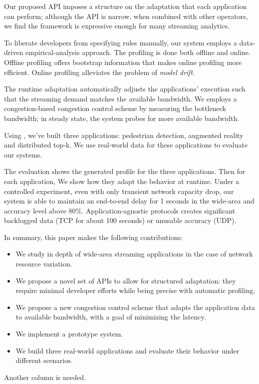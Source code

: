 Our proposed API imposes a structure on the adaptation that each application can
perform; although the API is narrow, when combined with other operators, we find
the framework is expressive enough for many streaming analytics.

To liberate developers from specifying rules manually, our system employs a
data-driven empirical-analysis approach. The profiling is done both offline and
online. Offline profiling offers bootstrap information that makes online
profiling more efficient. Online profiling alleviates the problem of
\textit{model drift}.

The runtime adaptation automatically adjusts the applications' execution such
that the streaming demand matches the available bandwidth. We employs a
congestion-based congestion control scheme by measuring the bottleneck
bandwidth; in steady state, the system probes for more available bandwidth.

Using \sysname{}, we've built three applications: pedestrian detection,
augmented reality and distributed top-k. We use real-world data for these
applications to evaluate our systems.

The evaluation shows the generated profile for the three applications. Then for
each application, We show how they adapt the behavior at runtime. Under a
controlled experiment, even with only transient network capacity drop, our
system is able to maintain an end-to-end delay for 1 seconds in the wide-area
and accuracy level above 80\%. Application-agnostic protocols creates
significant backlogged data (TCP for about 100 seconds) or unusable accuracy
(UDP).

In summary, this paper makes the following contributions:

\begin{itemize}[leftmargin=16pt]
\item We study in depth of wide-area streaming applications in the case of
  network resource variation.
\item We propose a novel set of APIs to allow for structured adaptation: they
  require minimal developer efforts while being precise with automatic
  profiling.
\item We propose a new congestion control scheme that adapts the application
  data to available bandwidth, with a goal of minimizing the latency.
\item We implement a prototype system.
\item We build three real-world applications and evaluate their behavior
  under different scenarios.
\end{itemize}

\newpage

Another column is needed.

\newpage

